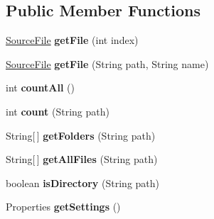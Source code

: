 \subsection*{Public Member Functions}
\begin{DoxyCompactItemize}
\item 
\hypertarget{classvideo_1_1_interface_a10f061a3cf60035457b0b6a219ce382d}{
\hyperlink{classvideo_1_1_source_file}{SourceFile} {\bfseries getFile} (int index)}
\label{classvideo_1_1_interface_a10f061a3cf60035457b0b6a219ce382d}

\item 
\hypertarget{classvideo_1_1_interface_aa8207229c73685428aa9d722aefd391a}{
\hyperlink{classvideo_1_1_source_file}{SourceFile} {\bfseries getFile} (String path, String name)}
\label{classvideo_1_1_interface_aa8207229c73685428aa9d722aefd391a}

\item 
\hypertarget{classvideo_1_1_interface_a81ead034c3afe036f69f2a9526561fa4}{
int {\bfseries countAll} ()}
\label{classvideo_1_1_interface_a81ead034c3afe036f69f2a9526561fa4}

\item 
\hypertarget{classvideo_1_1_interface_a0de7852086ec949c5b6cae0cc654e75b}{
int {\bfseries count} (String path)}
\label{classvideo_1_1_interface_a0de7852086ec949c5b6cae0cc654e75b}

\item 
\hypertarget{classvideo_1_1_interface_a50c388b22ac212eeee14e1db4fc30b13}{
String\mbox{[}$\,$\mbox{]} {\bfseries getFolders} (String path)}
\label{classvideo_1_1_interface_a50c388b22ac212eeee14e1db4fc30b13}

\item 
\hypertarget{classvideo_1_1_interface_a8f8f278f99232576c6ddde7f6860d107}{
String\mbox{[}$\,$\mbox{]} {\bfseries getAllFiles} (String path)}
\label{classvideo_1_1_interface_a8f8f278f99232576c6ddde7f6860d107}

\item 
\hypertarget{classvideo_1_1_interface_a4e8c904108a8b9adbb0f0cf9740f1931}{
boolean {\bfseries isDirectory} (String path)}
\label{classvideo_1_1_interface_a4e8c904108a8b9adbb0f0cf9740f1931}

\item 
\hypertarget{classvideo_1_1_interface_aad6a4f6a1d0f6a77aa3f4adec5d947ad}{
Properties {\bfseries getSettings} ()}
\label{classvideo_1_1_interface_aad6a4f6a1d0f6a77aa3f4adec5d947ad}

\end{DoxyCompactItemize}
